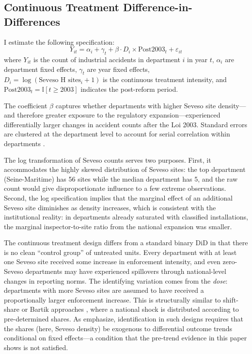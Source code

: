 \documentclass[12pt]{article}
\newcommand{\ind}{\mathbb{I}}
\begin{document}
\subsection{Continuous Treatment Difference-in-Differences}

I estimate the following specification:
\begin{equation}
Y_{it} = \alpha_i + \gamma_t + \beta \cdot D_i \times \text{Post2003}_t + \varepsilon_{it}
\label{eq:main}
\end{equation}
where $Y_{it}$ is the count of industrial accidents in department $i$ in year $t$, $\alpha_i$ are department fixed effects, $\gamma_t$ are year fixed effects, $D_i = \log(\text{Seveso H sites}_i + 1)$ is the continuous treatment intensity, and $\text{Post2003}_t = \ind[t \geq 2003]$ indicates the post-reform period.

The coefficient $\beta$ captures whether departments with higher Seveso site density---and therefore greater exposure to the regulatory expansion---experienced differentially larger changes in accident counts after the Loi 2003. Standard errors are clustered at the department level to account for serial correlation within departments \citep{bertrand2004}.

The log transformation of Seveso counts serves two purposes. First, it accommodates the highly skewed distribution of Seveso sites: the top department (Seine-Maritime) has 56 sites while the median department has 5, and the raw count would give disproportionate influence to a few extreme observations. Second, the log specification implies that the marginal effect of an additional Seveso site diminishes as density increases, which is consistent with the institutional reality: in departments already saturated with classified installations, the marginal inspector-to-site ratio from the national expansion was smaller.

The continuous treatment design differs from a standard binary DiD in that there is no clean ``control group'' of untreated units. Every department with at least one Seveso site received some increase in enforcement intensity, and even zero-Seveso departments may have experienced spillovers through national-level changes in reporting norms. The identifying variation comes from the \textit{dose}: departments with more Seveso sites are assumed to have received a proportionally larger enforcement increase. This is structurally similar to shift-share or Bartik approaches \citep{goldsmithpinkham2020,borusyak2022}, where a national shock is distributed according to pre-determined shares. As \citet{goldsmithpinkham2020} emphasize, identification in such designs requires that the shares (here, Seveso density) be exogenous to differential outcome trends conditional on fixed effects---a condition that the pre-trend evidence in this paper shows is not satisfied.
\end{document}

